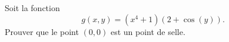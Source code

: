 
\begin{exercice}\label{exoMaximisation-0002}

	Soit la fonction
	\begin{equation}
		g(x,y)=(x^4+1)(2+\cos(y)).
	\end{equation}
	Prouver que le point $(0,0)$ est un point de selle.

\end{exercice}
